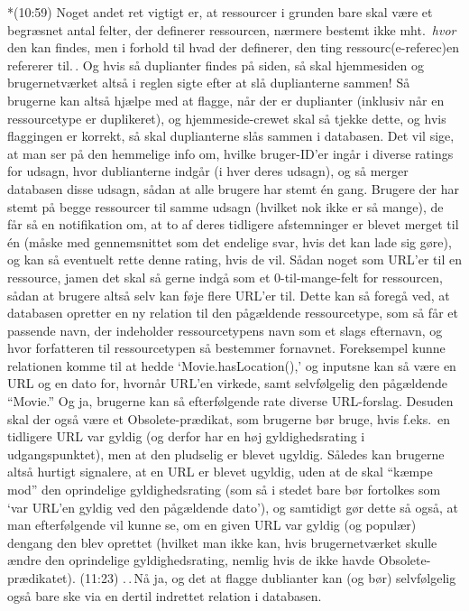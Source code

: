 \documentclass{report}
\begin{document}
*(10:59) Noget andet ret vigtigt er, at ressourcer i grunden bare skal være et begræsnet antal felter, der definerer ressourcen, nærmere bestemt ikke mht.\ \emph{hvor} den kan findes, men i forhold til hvad der definerer, den ting ressourc(e-referec)en refererer til.\,. Og hvis så duplianter findes på siden, så skal hjemmesiden og brugernetværket altså i reglen sigte efter at slå duplianterne sammen! Så brugerne kan altså hjælpe med at flagge, når der er duplianter (inklusiv når en ressourcetype er duplikeret), og hjemmeside-crewet skal så tjekke dette, og hvis flaggingen er korrekt, så skal duplianterne slås sammen i databasen. Det vil sige, at man ser på den hemmelige info om, hvilke bruger-ID'er ingår i diverse ratings for udsagn, hvor dublianterne indgår (i hver deres udsagn), og så merger databasen disse udsagn, sådan at alle brugere har stemt én gang. Brugere der har stemt på begge ressourcer til samme udsagn (hvilket nok ikke er så mange), de får så en notifikation om, at to af deres tidligere afstemninger er blevet merget til én (måske med gennemsnittet som det endelige svar, hvis det kan lade sig gøre), og kan så eventuelt rette denne rating, hvis de vil. Sådan noget som URL'er til en ressource, jamen det skal så gerne indgå som et 0-til-mange-felt for ressourcen, sådan at brugere altså selv kan føje flere URL'er til. Dette kan så foregå ved, at databasen opretter en ny relation til den pågældende ressourcetype, som så får et passende navn, der indeholder ressourcetypens navn som et slags efternavn, og hvor forfatteren til ressourcetypen så bestemmer fornavnet. Foreksempel kunne relationen komme til at hedde `Movie.hasLocation(),' og inputsne kan så være en URL og en dato for, hvornår URL'en virkede, samt selvfølgelig den pågældende ``Movie.'' Og ja, brugerne kan så efterfølgende rate diverse URL-forslag. Desuden skal der også være et Obsolete-prædikat, som brugerne bør bruge, hvis f.eks.\ en tidligere URL var gyldig (og derfor har en høj gyldighedsrating i udgangspunktet), men at den pludselig er blevet ugyldig. Således kan brugerne altså hurtigt signalere, at en URL er blevet ugyldig, uden at de skal ``kæmpe mod'' den oprindelige gyldighedsrating (som så i stedet bare bør fortolkes som `var URL'en gyldig ved den pågældende dato'), og samtidigt gør dette så også, at man efterfølgende vil kunne se, om en given URL var gyldig (og populær) dengang den blev oprettet (hvilket man ikke kan, hvis brugernetværket skulle ændre den oprindelige gyldighedsrating, nemlig hvis de ikke havde Obsolete-prædikatet). (11:23) .\,.\,Nå ja, og det at flagge dublianter kan (og bør) selvfølgelig også bare ske via en dertil indrettet relation i databasen. 
\end{document}
